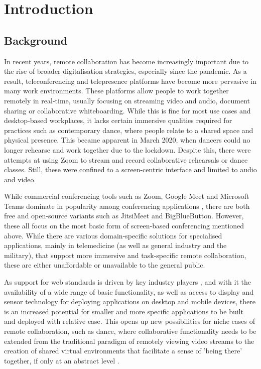 \chapter{Introduction}

\section{Background}
In recent years, remote collaboration has become increasingly important due to the rise of broader digitalisation strategies, especially since the pandemic. As a result, teleconferencing and telepresence platforms have become more pervasive in many work environments. These platforms allow people to work together remotely in real-time, usually focusing on streaming video and audio, document sharing or collaborative whiteboarding. While this is fine for most use cases and desktop-based workplaces, it lacks certain immersive qualities required for practices such as contemporary dance, where people relate to a shared space and physical presence. This became apparent in March 2020, when dancers could no longer rehearse and work together due to the lockdown. Despite this, there were attempts at using Zoom to stream and record collaborative rehearsals or dance classes. Still, these were confined to a screen-centric interface and limited to audio and video.

While commercial conferencing tools such as Zoom, Google Meet and Microsoft Teams dominate in popularity among conferencing applications \parencite{mostPopularConferencingPlatforms}, there are both free and open-source variants such as JitsiMeet and BigBlueButton. However, these all focus on the most basic form of screen-based conferencing mentioned above. While there are various domain-specific solutions for specialised applications, mainly in telemedicine (as well as general industry and the military), that support more immersive and task-specific remote collaboration, these are either unaffordable or unavailable to the general public.

As support for web standards is driven by key industry players \parencite{pushingInteroperabilityForward}, and with it the availability of a wide range of basic functionality, as well as access to display and sensor technology for deploying applications on desktop and mobile devices, there is an increased potential for smaller and more specific applications to be built and deployed with relative ease. This opens up new possibilities for niche cases of remote collaboration, such as dance, where collaborative functionality needs to be extended from the traditional paradigm of remotely viewing video streams to the creation of shared virtual environments that facilitate a sense of 'being there' together, if only at an abstract level \parencite{surveyOfPresence}.

